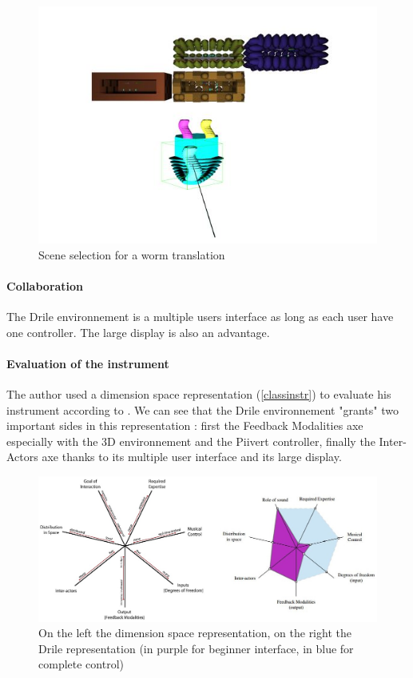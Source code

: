 \begin{figure}[h!]
\centering\includegraphics[scale=0.3]{image/scenes.JPG}
\caption{Scene selection for a worm translation}
\label{fig:scene}
\end{figure} 

\paragraph{Collaboration}

The Drile environnement is a multiple users interface as long as each user have one controller. The large display is also an advantage.

\paragraph{Evaluation of the instrument}

The author used a dimension space representation (\ref{classinstr}) to evaluate his instrument according to \cite{birnbaum2005towards}. We can see that the Drile environnement "grants" two important sides in this representation : first the Feedback Modalities axe especially with the 3D environnement and the Piivert controller, finally the Inter-Actors axe thanks to its multiple user interface and its large display.

\begin{figure}[h!]
\centering\includegraphics[scale=0.3]{image/classification_new_instr.jpg}
\caption{On the left the dimension space representation,
on the right the Drile representation (in purple for beginner interface, in blue for complete control)}
\label{fig:classinstr}
\end{figure} 


